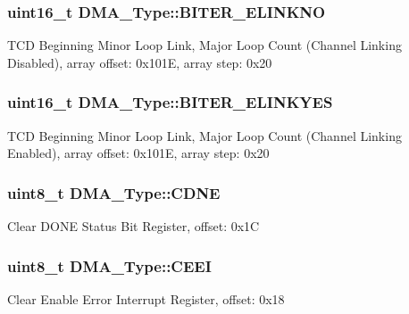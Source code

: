 \subsubsection[{\texorpdfstring{B\+I\+T\+E\+R\+\_\+\+E\+L\+I\+N\+K\+NO}{BITER_ELINKNO}}]{ uint16\+\_\+t D\+M\+A\+\_\+\+Type\+::\+B\+I\+T\+E\+R\+\_\+\+E\+L\+I\+N\+K\+NO}\hypertarget{structDMA__Type_aee2d5fcff4ca988778b0ee149090d722}{}\label{structDMA__Type_aee2d5fcff4ca988778b0ee149090d722}
T\+CD Beginning Minor Loop Link, Major Loop Count (Channel Linking Disabled), array offset\+: 0x101E, array step\+: 0x20 
\subsubsection[{\texorpdfstring{B\+I\+T\+E\+R\+\_\+\+E\+L\+I\+N\+K\+Y\+ES}{BITER_ELINKYES}}]{ uint16\+\_\+t D\+M\+A\+\_\+\+Type\+::\+B\+I\+T\+E\+R\+\_\+\+E\+L\+I\+N\+K\+Y\+ES}\hypertarget{structDMA__Type_a464e53c6509e80088037269a63565219}{}\label{structDMA__Type_a464e53c6509e80088037269a63565219}
T\+CD Beginning Minor Loop Link, Major Loop Count (Channel Linking Enabled), array offset\+: 0x101E, array step\+: 0x20 
\subsubsection[{\texorpdfstring{C\+D\+NE}{CDNE}}]{ uint8\+\_\+t D\+M\+A\+\_\+\+Type\+::\+C\+D\+NE}\hypertarget{structDMA__Type_a96b2cab7238911194871a50890b46262}{}\label{structDMA__Type_a96b2cab7238911194871a50890b46262}
Clear D\+O\+NE Status Bit Register, offset\+: 0x1C 
\subsubsection[{\texorpdfstring{C\+E\+EI}{CEEI}}]{ uint8\+\_\+t D\+M\+A\+\_\+\+Type\+::\+C\+E\+EI}\hypertarget{structDMA__Type_ab7b2be4f889b706c67eec2aa19d296d0}{}\label{structDMA__Type_ab7b2be4f889b706c67eec2aa19d296d0}
Clear Enable Error Interrupt Register, offset\+: 0x18 
